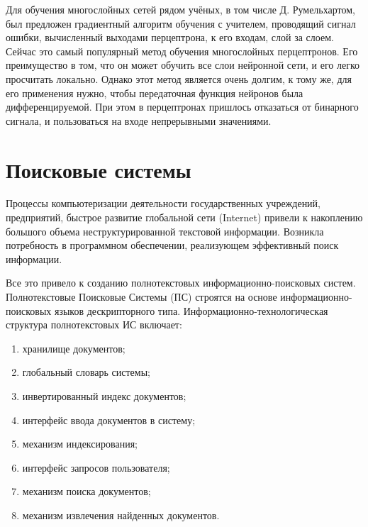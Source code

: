 Для обучения многослойных сетей рядом учёных, в том числе Д. Румельхартом, был предложен градиентный алгоритм обучения с учителем, проводящий сигнал ошибки, вычисленный выходами перцептрона, к его входам, слой за слоем. Сейчас это самый популярный метод обучения многослойных перцептронов. Его преимущество в том, что он может обучить все слои нейронной сети, и его легко просчитать локально. Однако этот метод является очень долгим, к тому же, для его применения нужно, чтобы передаточная функция нейронов была дифференцируемой. При этом в перцептронах пришлось отказаться от бинарного сигнала, и пользоваться на входе непрерывными значениями.


\section{Поисковые системы}
Процессы компьютеризации деятельности государственных учреждений, предприятий, быстрое развитие глобальной сети (Internet) привели к накоплению большого объема неструктурированной текстовой информации. Возникла потребность в программном обеспечении, реализующем эффективный поиск информации.

Все это привело к созданию полнотекстовых информационно-поисковых систем. Полнотекстовые Поисковые Системы (ПС)  строятся на основе информационно-поисковых языков дескрипторного типа. Информационно-технологическая структура полнотекстовых ИС включает:
\begin{enumerate}
	\item хранилище документов; 
	\item глобальный словарь системы; 
	\item инвертированный индекс документов; 
	\item интерфейс ввода документов в систему; 
	\item механизм индексирования; 
	\item интерфейс запросов пользователя; 
	\item механизм поиска документов; 
	\item механизм извлечения найденных документов.
\end{enumerate} 

